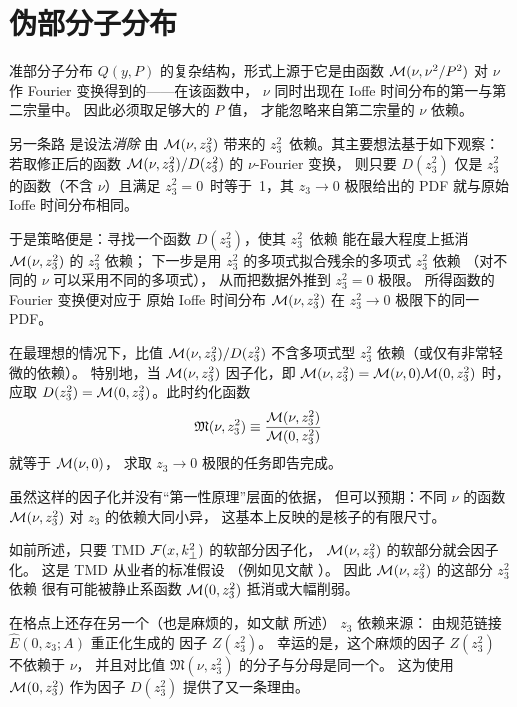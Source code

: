 \section{伪部分子分布}

准部分子分布 $Q(y,P)$ 的复杂结构，形式上源于它是由函数
${\cal M} (\nu, \nu^2/P^2)$ 对 $\nu$ 作 Fourier 变换得到的——在该函数中，
$\nu$ 同时出现在 Ioffe 时间分布的第一与第二宗量中。
因此必须取足够大的 $P$ 值，
才能忽略来自第二宗量的 $\nu$ 依赖。

另一条路 \cite{Radyushkin:2017cyf} 是设法{\it 消除}
由 ${\cal M} (\nu, z_3^2)$ 带来的 \mbox{$z_3^2$ 依赖}。其主要想法基于如下观察：
若取修正后的函数 ${\cal M} (\nu, z_3^2)/D(z_3^2)$ 的 $\nu$-Fourier 变换，
则只要 $D(z_3^2)$ 仅是 $z_3^2$ 的函数（不含 $\nu$）且满足
\mbox{$z_3^2=0$ 时等于 1}，其 $z_3\to 0$ 极限给出的 PDF 就与原始 Ioffe 时间分布相同。

于是策略便是：寻找一个函数 $D(z_3^2)$，使其 \mbox{$z_3^2$ 依赖}
能在最大程度上抵消 ${\cal M} (\nu, z_3^2)$ 的 $z_3^2$ 依赖；
下一步是用 $z_3^2$ 的多项式拟合残余的多项式 $z_3^2$ 依赖
（对不同的 $\nu$ 可以采用不同的多项式），
从而把数据外推到 $z_3^2=0$ 极限。
所得函数的 Fourier 变换便对应于
原始 Ioffe 时间分布 ${\cal M} (\nu, z_3^2)$ 在 $z_3^2 \to 0$ 极限下的同一 PDF。


在最理想的情况下，比值 ${\cal M} (\nu, z_3^2)/D(z_3^2)$
不含多项式型 $z_3^2$ 依赖（或仅有非常轻微的依赖）。
特别地，当 ${\cal M} (\nu, z_3^2)$ 因子化，即
 ${\cal M} (\nu, z_3^2)= {\cal M} (\nu, 0) {\cal M} (0, z_3^2)$ 时，
应取 \mbox{$D(z_3^2) ={\cal M} (0, z_3^2)$}。此时约化函数
\begin{align}
{\mathfrak M} (\nu, z_3^2) \equiv \frac{ {\cal M} (\nu, z_3^2)}{{\cal M} (0, z_3^2)} \
 \label{redm}
\end{align}
就等于 $ {\cal M} (\nu, 0)$，
求取 $z_3\to 0$ 极限的任务即告完成。

虽然这样的因子化并没有“第一性原理”层面的依据，
但可以预期：不同 $\nu$ 的函数 ${\cal M} (\nu, z_3^2)$
对 $z_3$ 的依赖大同小异，
这基本上反映的是核子的有限尺寸。

如前所述，只要 TMD ${\cal F} (x,k_\perp^2)$ 的软部分因子化，
${\cal M} (\nu, z_3^2)$ 的软部分就会因子化。
这是 TMD 从业者的标准假设
（例如见文献 \cite{Anselmino:2013lza}）。
因此 ${\cal M} (\nu, z_3^2)$ 的这部分 $z_3^2$ 依赖
很有可能被静止系函数 ${\cal M} (0, z_3^2) $ 抵消或大幅削弱。


在格点上还存在另一个（也是麻烦的，如文献 \cite{Ishikawa:2016znu} 所述）
$z_3$ 依赖来源：
由规范链接 ${ \hat E} (0,z_3; A)$ 重正化生成的
因子 $Z(z_3^2)$。
幸运的是，这个麻烦的因子 $Z(z_3^2)$ 不依赖于 $\nu$，
并且对比值 ${\mathfrak M} (\nu, z_3^2) $ 的分子与分母是同一个。
这为使用 ${\cal M} (0, z_3^2)$ 作为因子 $D(z_3^2)$ 提供了又一条理由。

